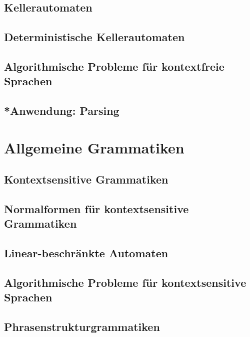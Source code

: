 \documentclass[11pt, a4paper]{article}
\theoremstyle{definition}
\theoremstyle{plain}
\numberwithin{equation}{section}
\begin{document}
\subsection{Kellerautomaten}\label{sec:contextfree_pda}


\subsection{Deterministische Kellerautomaten}\label{sec:contextfree_dpda}


\subsection{Algorithmische Probleme für kontextfreie Sprachen}\label{sec:contextfree_algorithms}


\subsection{*Anwendung: Parsing}\label{sec:contextfree_parsing}



\newpage
\section{Allgemeine Grammatiken}\label{sec:grammars}
\subsection{Kontextsensitive Grammatiken}\label{sec:grammars_csg}


\subsection{Normalformen für kontextsensitive Grammatiken}\label{sec:grammars_normalforms}


\subsection{Linear-beschränkte Automaten}\label{sec:grammars_lba} %


\subsection{Algorithmische Probleme für kontextsensitive Sprachen}\label{sec:grammars_algorithms}


\subsection{Phrasenstrukturgrammatiken}\label{sec:grammars_unrestricted}
\end{document}
